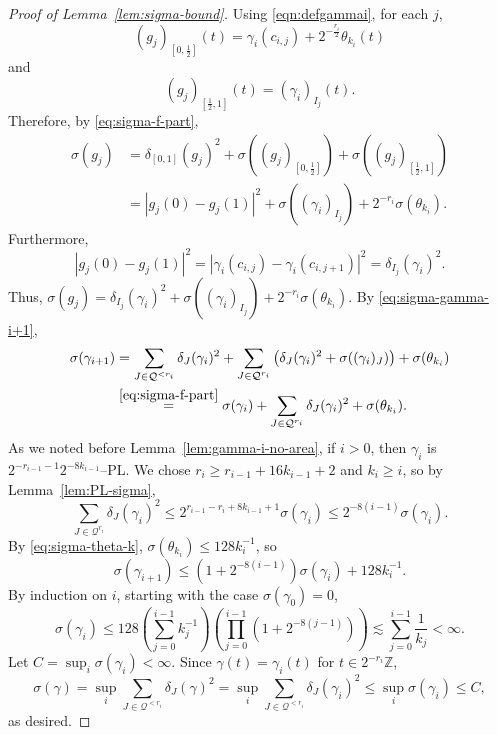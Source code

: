 \documentclass[12pt,reqno]{amsart}
\newcommand{\cQ}{\mathcal{Q}}
\newcommand{\Z}{\mathbb{Z}}
\theoremstyle{remark}
\newcommand{\0}{\mathbf{0}}
\renewcommand{\1}{\mathbf 1}
\begin{document}
\begin{proof}[Proof of Lemma~\ref{lem:sigma-bound}]
  Using \eqref{eqn:defgammai}, for each $j$,
  $$(g_j)_{[0,\frac{1}{2}]}(t) = \gamma_i(c_{i,j}) + 2^{-\frac{r_i}{2}} \theta_{k_i}(t)$$
  and
  $$(g_j)_{[\frac{1}{2},1]}(t) = (\gamma_i)_{I_j}(t).$$
  Therefore, by \eqref{eq:sigma-f-part},
  $$
  \begin{aligned}
    \sigma(g_j) &= \delta_{[0,1]}(g_j)^2 + \sigma((g_j)_{[0,\frac{1}{2}]}) +  \sigma((g_j)_{[\frac{1}{2},1]}) \\
  &= |g_j(0) - g_j(1)|^2 + \sigma((\gamma_i)_{I_j}) + 2^{-r_i}\sigma(\theta_{k_i}).
  \end{aligned}
  $$
  Furthermore,
  $$|g_j(0) - g_j(1)|^2 = |\gamma_i(c_{i,j}) - \gamma_i(c_{i,j+1})|^2 = \delta_{I_j}(\gamma_i)^2.$$
  Thus, $\sigma(g_j) = \delta_{I_j}(\gamma_i)^2 + \sigma((\gamma_i)_{I_j}) + 2^{-r_i}\sigma(\theta_{k_i})$. By \eqref{eq:sigma-gamma-i+1}, 
  \begin{align*}
    \sigma(\gamma_{i+1})
    & = \sum_{J\in \cQ^{< r_i}} \delta_J(\gamma_{i})^2 + \sum_{J\in \cQ^{r_i}} \left(\delta_J(\gamma_i)^2 + \sigma((\gamma_i)_{J})\right) + \sigma(\theta_{k_i}) \\
    & \stackrel{\eqref{eq:sigma-f-part}}{=} \sigma(\gamma_{i}) + \sum_{J\in \cQ^{r_i}} \delta_J(\gamma_i)^2 + \sigma(\theta_{k_i}).
  \end{align*}
  As we noted before Lemma~\ref{lem:gamma-i-no-area}, if $i>0$, then $\gamma_i$ is $2^{-r_{i-1}-1}2^{-8k_{i-1}}$--PL. We chose $r_{i} \ge r_{i-1} + 16k_{i-1} + 2$ and $k_i \ge i$, so by Lemma~\ref{lem:PL-sigma},
  $$\sum_{J\in \cQ^{r_i}} \delta_J(\gamma_i)^2 \le 2^{r_{i-1} - r_i  + 8k_{i-1} + 1}\sigma(\gamma_{i}) \le 2^{-8(i-1)} \sigma(\gamma_{i}).
  $$
  By \eqref{eq:sigma-theta-k}, $\sigma(\theta_{k_i}) \le 128 k_i^{-1}$, so 
  $$\sigma(\gamma_{i+1}) \le (1+2^{-8(i-1)})\sigma(\gamma_i) + 128k_i^{-1}.$$
  By induction on $i$, starting with the case $\sigma(\gamma_0) = 0$,
  $$
  \sigma(\gamma_i) \le 128 \left(\sum_{j=0}^{i-1} k_j^{-1}\right) \left(\prod_{j=0}^{i-1} (1+2^{-8(j-1)})\right) \lesssim \sum_{j=0}^{i-1} \frac{1}{k_j} < \infty.$$
  Let $C = \sup_i \sigma(\gamma_i) < \infty$.
  Since $\gamma(t) = \gamma_i(t)$ for $t\in 2^{-r_i}\Z$,
  $$\sigma(\gamma) = \sup_i \sum_{J\in \cQ^{<r_i}} \delta_J(\gamma)^2 = \sup_i \sum_{J\in \cQ^{<r_i}} \delta_J(\gamma_i)^2 \le \sup_i \sigma(\gamma_i)\le C,$$
  as desired.
\end{proof}
\end{document}
